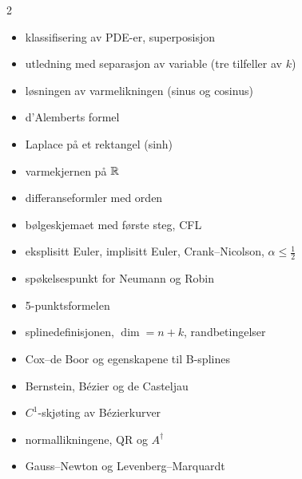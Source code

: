 \begin{multicols}{2}
\begin{itemize}
  \item klassifisering av PDE-er, superposisjon
  \item utledning med separasjon av variable (tre tilfeller av $k$)
  \item løsningen av varmelikningen (sinus og cosinus)
  \item d'Alemberts formel
  \item Laplace på et rektangel (sinh)
  \item varmekjernen på $\mathbb{R}$
  \item differanseformler med orden
  \item bølgeskjemaet med første steg, CFL
  \item eksplisitt Euler, implisitt Euler, Crank--Nicolson, $\alpha\le\frac12$
  \item spøkelsespunkt for Neumann og Robin
  \item 5-punktsformelen
  \item splinedefinisjonen, $\dim=n+k$, randbetingelser
  \item Cox--de Boor og egenskapene til B-splines
  \item Bernstein, Bézier og de Casteljau
  \item $C^1$-skjøting av Bézierkurver
  \item normallikningene, QR og $A^\dagger$
  \item Gauss--Newton og Levenberg--Marquardt
\end{itemize}
\end{multicols}
